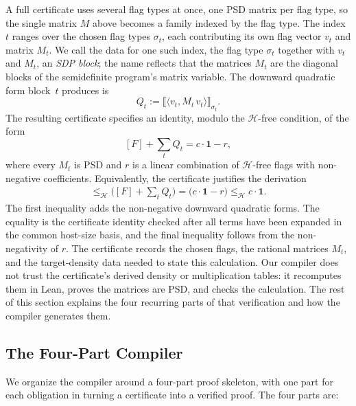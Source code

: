 \documentclass{article}
\begin{document}
A full certificate uses several flag types at once, one PSD matrix per flag
type, so the single matrix $M$ above becomes a family indexed by the flag type.
The index $t$ ranges over the chosen flag types $\sigma_t$, each contributing
its own flag vector $v_t$ and matrix $M_t$.  We call the data for one such
index, the flag type $\sigma_t$ together with $v_t$ and $M_t$, an \emph{SDP block};
the name reflects that the matrices $M_t$ are the diagonal blocks of the
semidefinite program's matrix variable.  The downward quadratic form
block~$t$ produces is
\[
  Q_t := \bigl\llbracket
    \langle v_t, M_t\, v_t\rangle
  \bigr\rrbracket_{\sigma_t}.
\]
The resulting certificate specifies an identity, modulo the $\mathcal H$-free
condition, of the form
\[
  [F] + \sum_t Q_t
  =
  c\cdot\mathbf{1} - r,
\]
where every $M_t$ is PSD and $r$ is a linear combination of $\mathcal H$-free
flags with non-negative coefficients.  Equivalently,
the certificate justifies the derivation
\begin{align*}
  [F]
  \leq_{\mathcal H}
  \bigl([F]+\sum_t Q_t\bigr)
  =
  \bigl(c\cdot\mathbf{1}-r\bigr)
  \leq_{\mathcal H} c\cdot\mathbf{1}.
\end{align*}
The first inequality adds the non-negative downward quadratic forms.  The
equality is the certificate identity checked after all terms have been
expanded in the common host-size basis, and the final inequality follows from
the non-negativity of $r$.  The certificate records the chosen
flags, the rational matrices $M_t$, and the target-density data needed to state
this calculation.  Our compiler does not trust the certificate's derived
density or multiplication tables: it recomputes them in Lean, proves the
matrices are PSD, and checks the calculation.  The rest of this section explains
the four recurring parts of that verification and how the compiler generates
them.


\subsection{The Four-Part Compiler}
\label{sec:flagmatic-shape}
\label{sec:flagmatic-pipeline}
\label{sec:flagmatic-gen}\label{sec:flagmatic-psd}\label{sec:flagmatic-expand}%
\label{sec:flagmatic-close}\label{sec:flagmatic-script}%

We organize the compiler around a four-part proof skeleton, with one part
for each obligation in turning a certificate into a verified proof.  The four
parts are:
\end{document}
